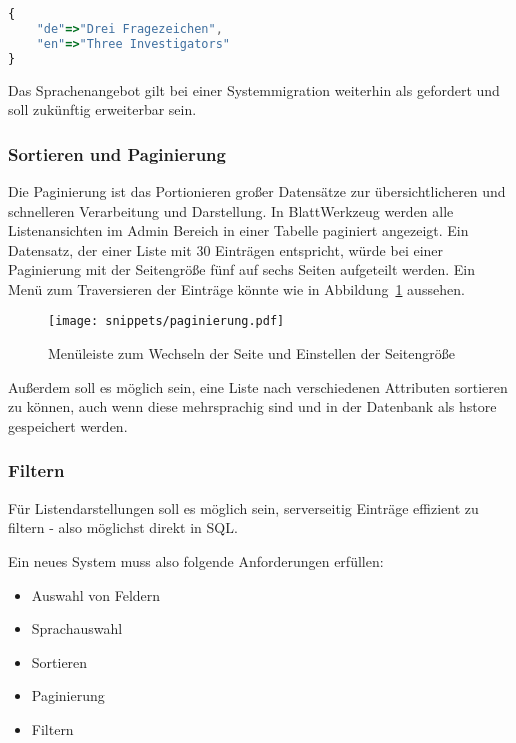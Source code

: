 \begin{lstlisting}[language=JavaScript,float=h!,caption={Speicherung der Projektnamen als hstore}, label={sec:requirements:multilang}]
{
    "de"=>"Drei Fragezeichen",
    "en"=>"Three Investigators"
}
\end{lstlisting}

Das Sprachenangebot gilt bei einer Systemmigration weiterhin als gefordert und soll zukünftig erweiterbar sein.

\subsubsection{Sortieren und Paginierung}
Die Paginierung ist das Portionieren großer Datensätze zur übersichtlicheren und schnelleren Verarbeitung und Darstellung.
In BlattWerkzeug werden alle Listenansichten im Admin Bereich in einer Tabelle paginiert angezeigt.
Ein Datensatz, der einer Liste mit 30 Einträgen entspricht, würde bei einer Paginierung mit der Seitengröße fünf auf sechs Seiten aufgeteilt werden.
Ein Menü zum Traversieren der Einträge könnte wie in Abbildung~\ref{req:view:pagination} aussehen.

\begin{figure}[h!]
    \centering
    \texttt{[image: snippets/paginierung.pdf]}
    \caption{Menüleiste zum Wechseln der Seite und Einstellen der Seitengröße}
    \label{req:view:pagination}
\end{figure}

Außerdem soll es möglich sein, eine Liste nach verschiedenen Attributen sortieren zu können, auch wenn diese mehrsprachig sind und
in der Datenbank als hstore gespeichert werden.

\subsubsection{Filtern}

Für Listendarstellungen soll es möglich sein, serverseitig Einträge effizient zu filtern - also möglichst direkt in SQL.

Ein neues System muss also folgende Anforderungen erfüllen:
\begin{itemize}
	\setlength\itemsep{-1em}
	\item Auswahl von Feldern
	\item Sprachauswahl
	\item Sortieren
	\item Paginierung
	\item Filtern
\end{itemize}
